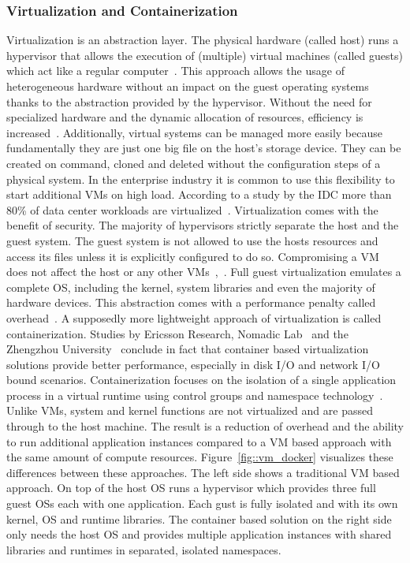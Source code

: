 \documentclass[12pt, a4paper]{article}
\begin{document}
        \subsubsection{Virtualization and Containerization}\label{sssec::virtual}
        Virtualization is an abstraction layer. The physical hardware (called host) runs a hypervisor that allows the execution of (multiple) virtual machines (called guests) which act like a regular computer~\cite{vmbasics}. This approach allows the usage of heterogeneous hardware without an impact on the guest operating systems thanks to the abstraction provided by the hypervisor. Without the need for specialized hardware and the dynamic allocation of resources, efficiency is increased~\cite{redhat_venv}. Additionally, virtual systems can be managed more easily because fundamentally they are just one big file on the host's storage device. They can be created on command, cloned and deleted without the configuration steps of a physical system. In the enterprise industry it is common to use this flexibility to start additional \ac{VM}s on high load. According to a study by the \ac{IDC} more than 80\% of data center workloads are virtualized~\cite{virtualaddoption}. Virtualization comes with the benefit of security. The majority of hypervisors strictly separate the host and the guest system. The guest system is not allowed to use the hosts resources and access its files unless it is explicitly configured to do so. Compromising a \ac{VM} does not affect the host or any other \ac{VM}s~\cite{vmbasics},~\cite{redhat_venv}.\newline
        Full guest virtualization emulates a complete \ac{OS}, including the kernel, system libraries and even the majority of hardware devices. This abstraction comes with a performance penalty called overhead~\cite{vmbasics}. A supposedly more lightweight approach of virtualization is called containerization. Studies by Ericsson Research, Nomadic Lab~\cite{ieee_perfomance} and the Zhengzhou University~\cite{zhengzhou_university} conclude in fact that container based virtualization solutions provide better performance, especially in disk \acs{I/O} and network \acs{I/O} bound scenarios. Containerization focuses on the isolation of a single application process in a virtual runtime using control groups and namespace technology~\cite{cgroups}. Unlike \ac{VM}s, system and kernel functions are not virtualized and are passed through to the host machine. The result is a reduction of overhead and the ability to run additional application instances compared to a \ac{VM} based approach with the same amount of compute resources. Figure~\ref{fig::vm_docker} visualizes these differences between these approaches. The left side shows a traditional \ac{VM} based approach. On top of the host \ac{OS} runs a hypervisor which provides three full guest \acl{OS}s each with one application. Each gust is fully isolated and with its own kernel, \ac{OS} and runtime libraries. The container based solution on the right side only needs the host \ac{OS} and provides multiple application instances with shared libraries and runtimes in separated, isolated namespaces.\newline
\end{document}
